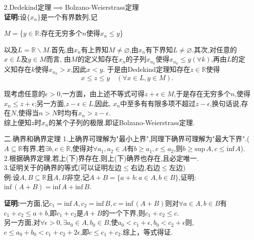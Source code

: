 \documentclass[UTF8]{ctexbeamer}
\begin{document}
    \begin{frame}
        2.Dedekind定理$\implies$Bolzano-Weierstrass定理
        \pause
        \\\textbf{证明:}设$\{x_n\}$是一个有界数列,记
        \begin{center}
            $M=$\{$y\in\mathbb{R}$:存在无穷多个$n$使得$x_n\leqslant y$\}
        \end{center}
        以及$L=\mathbb{R}\backslash M$.首先,由${x_n}$有上界知$M\neq\varnothing$,由${x_n}$有下界知$L\neq\varnothing$.其次,对任意的$x\in L$及$y\in M$而言,
        由$M$的定义知存在${x_n}$的子列${x_{n_k}}$使得$x_{n_k}\leqslant y(\forall k)$,再由$L$的定义知存在$k$使得$x_{n_k}>x$,因此$x<y$.
        于是由Dedekind定理知存在$z\in\mathbb{R}$使得
        $$x\leqslant z\leqslant y\quad(\forall x\in L,y\in M).$$
    \end{frame}
    \begin{frame}
        现考虑任意的$\epsilon>0$,一方面，由上述不等式可得$z+\epsilon\in M$,于是存在无穷多个$n$,使得$x_n\leqslant z+\epsilon$;另一方面,$z-\epsilon\in L$,因此,
        ${x_n}$中至多有有限多项不超过$z-\epsilon$,换句话说,存在$N$,使得当$n>N$时均有$x_n>z-\epsilon$.
        \\综上便知$z$时${x_n}$的某个子列的极限.即证Bolzano-Weierstrass定理.
    \end{frame}
    \begin{frame}{二.确界和确界定理}
        1.上确界可理解为"最小上界",同理下确界可理解为"最大下界".($A\subseteq\mathbb{R}$有界,若$\exists b,c\in\mathbb{R}$,使得对$\forall a_1,a_2\in A$有$b\geqslant a_1,c\leqslant a_2$,则$b\geqslant\mathrm{sup}\,A,c\leqslant\mathrm{inf}\,A$).
        \\2.根据确界定理,若上(下)界存在,则上(下)确界也存在,且必定唯一.
        \\3.证明关于的确界的等式(可以证明左边$\leqslant$右边,右边$\leqslant$左边)
        \\例:设$A,B\subseteq\mathbb{R}$且$A,B$非空,记$A+B=\{a+b:a\in A,b\in B\}$,证明:$\mathrm{inf}\,(A+B)=\mathrm{inf}\,A+\mathrm{inf}\,B$.
    \end{frame}
    \begin{frame}
        \textbf{证明:}一方面,记$c_1=\mathrm{inf}\,A,c_2=\mathrm{inf}\,B,c=\mathrm{inf}\,(A+B)$则对$\forall a\in A,b\in B$有$c_1+c_2\leqslant a+b$,即$c_1+c_2$是$A+B$的一个下界,则$c_1+c_2\leqslant c$.
        \\另一方面,对$\forall \epsilon>0,\exists a_0\in A,b_0\in B$,使$a_0<c_1+\epsilon,b_0<c_2+\epsilon$则,$c\leqslant a_0+b_0<c_1+c_2+2\epsilon$,即$c\leqslant c_1+c_2$.综上，等式得证.
    \end{frame}
\end{document}
